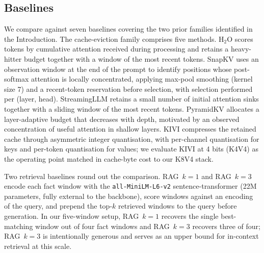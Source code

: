 \subsection{Baselines}\label{sec:baselines}

We compare against seven baselines covering the two prior families
identified in the Introduction. The cache-eviction family comprises
five methods. H${}_2$O\cite{zhang2023h2o} scores tokens by cumulative
attention received during processing and retains a heavy-hitter
budget together with a window of the most recent tokens. SnapKV\cite{li2024snapkv}
uses an observation window at the end of the prompt to identify
positions whose post-softmax attention is locally concentrated,
applying max-pool smoothing (kernel size 7) and a recent-token
reservation before selection, with selection performed per
(layer, head). StreamingLLM\cite{xiao2024streamingllm} retains a
small number of initial attention sinks together with a sliding
window of the most recent tokens. PyramidKV\cite{cai2024pyramidkv}
allocates a layer-adaptive budget that decreases with depth,
motivated by an observed concentration of useful attention in
shallow layers. KIVI\cite{liu2024kivi} compresses the retained cache
through asymmetric integer quantisation, with per-channel
quantisation for keys and per-token quantisation for values; we
evaluate KIVI at 4 bits (K4V4) as the operating point matched in
cache-byte cost to our K8V4 stack.

Two retrieval baselines round out the comparison. RAG~$k{=}1$ and
RAG~$k{=}3$ encode each fact window with the
\texttt{all-MiniLM-L6-v2} sentence-transformer (22M parameters,
fully external to the backbone), score windows against an encoding of
the query, and prepend the top-$k$ retrieved windows to the query
before generation. In our five-window setup, RAG~$k{=}1$ recovers the
single best-matching window out of four fact windows and RAG~$k{=}3$
recovers three of four; RAG~$k{=}3$ is intentionally generous and
serves as an upper bound for in-context retrieval at this scale.

